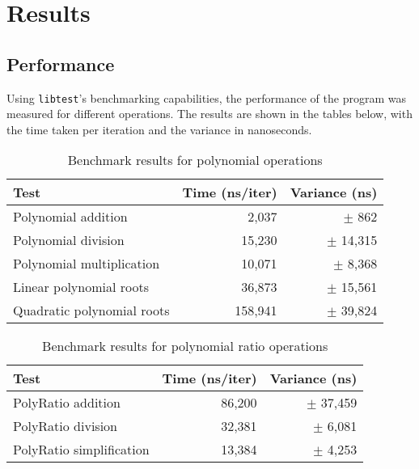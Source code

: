 \section{Results}\label{sec:results}

\subsection{Performance}\label{subsec:performance}

Using \verb|libtest|'s benchmarking capabilities, the performance of the program was measured for different operations. The results are shown in the tables below, with the time taken per iteration and the variance in nanoseconds.

\begin{table}[h!]
    \centering
    \begin{tabular}{lrr}
        \toprule
        \textbf{Test} & \textbf{Time (ns/iter)} & \textbf{Variance (ns)} \\
        \midrule
        Polynomial addition             & 2,037   & $\pm$ 862    \\
        Polynomial division             & 15,230  & $\pm$ 14,315 \\
        Polynomial multiplication       & 10,071  & $\pm$ 8,368  \\
        Linear polynomial roots         & 36,873  & $\pm$ 15,561 \\
        Quadratic polynomial roots      & 158,941 & $\pm$ 39,824 \\
        \bottomrule
    \end{tabular}
    \caption{Benchmark results for polynomial operations}
\end{table}

\begin{table}[h!]
    \centering
    \begin{tabular}{lrr}
        \toprule
        \textbf{Test} & \textbf{Time (ns/iter)} & \textbf{Variance (ns)} \\
        \midrule
        PolyRatio addition          & 86,200  & $\pm$ 37,459 \\
        PolyRatio division          & 32,381  & $\pm$ 6,081  \\
        PolyRatio simplification    & 13,384  & $\pm$ 4,253  \\
        \bottomrule
    \end{tabular}
    \caption{Benchmark results for polynomial ratio operations}
\end{table}

